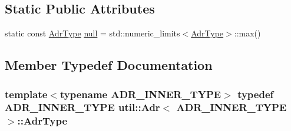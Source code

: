 \subsection*{Static Public Attributes}
\begin{DoxyCompactItemize}
\item 
static const \hyperlink{structutil_1_1Adr_a9e5161dc90263db4a33e195e310ccc45}{Adr\-Type} \hyperlink{structutil_1_1Adr_a9a09c97d346a91e3ede256eafd6c79dd}{null} = std\-::numeric\-\_\-limits$<$\hyperlink{structutil_1_1Adr_a9e5161dc90263db4a33e195e310ccc45}{Adr\-Type}$>$\-::max()
\end{DoxyCompactItemize}


\subsection{Member Typedef Documentation}
\hypertarget{structutil_1_1Adr_a9e5161dc90263db4a33e195e310ccc45}{
\subsubsection[{Adr\-Type}]{\setlength{\rightskip}{0pt plus 5cm}template$<$typename A\-D\-R\-\_\-\-I\-N\-N\-E\-R\-\_\-\-T\-Y\-P\-E$>$ typedef A\-D\-R\-\_\-\-I\-N\-N\-E\-R\-\_\-\-T\-Y\-P\-E {\bf util\-::\-Adr}$<$ A\-D\-R\-\_\-\-I\-N\-N\-E\-R\-\_\-\-T\-Y\-P\-E $>$\-::{\bf Adr\-Type}}}\label{structutil_1_1Adr_a9e5161dc90263db4a33e195e310ccc45}


